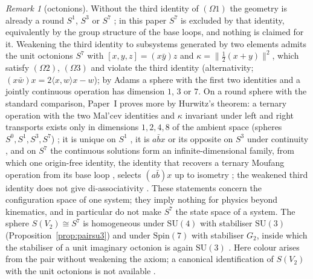 \documentclass[aps,pra,onecolumn,superscriptaddress,nofootinbib,10pt]{revtex4-2}
\theoremstyle{definition}
\theoremstyle{remark}
\newtheorem{remark}[theorem]{Remark}
\newcommand{\ip}[2]{\langle #1,#2\rangle}
\newcommand{\hp}[3]{[#1,#2,#3]}
\newcommand{\SU}{\mathrm{SU}}
\begin{document}
\begin{remark}[octonions]\label{rem:octonions}
Without the third identity of $(\Omega1)$ the geometry is already a round $S^1$, $S^3$ or $S^7$
\cite[Thm.~5.18, Cor.~5.19]{PaperI}; in this paper $S^7$ is excluded by that identity, equivalently by the group
structure of the base loops, and nothing is claimed for it.  Weakening the third identity to subsystems
generated by two elements admits the unit octonions $S^7$ with $\hp{x}{y}{z}=(x\bar y)z$ and $\kappa=\lVert\tfrac12(x+y)\rVert^2$, which satisfy
$(\Omega2)$, $(\Omega3)$ and violate the third identity (alternativity; $(x\bar w)x=2\ip{x}{w}x-w$); by
Adams \cite{Adams} a sphere with the first two identities and a jointly continuous operation has dimension $1$, $3$ or $7$.  On a round sphere
with the standard comparison, Paper~I proves more by Hurwitz's theorem: a ternary operation with the two
Mal'cev identities and $\kappa$ invariant under left and right transports exists only in dimensions $1,2,4,8$
of the ambient space (spheres $S^0,S^1,S^3,S^7$) \cite[Prop.~5.13]{PaperI}; it is unique on $S^1$ \cite[Rem.~5.14]{PaperI}, it is $a\bar bx$ or its
opposite on $S^3$ under continuity \cite[Thm.~5.15]{PaperI}, and on $S^7$ the continuous solutions form an
infinite-dimensional family, from which one origin-free identity, the identity that recovers a ternary
Moufang operation from its base loop \cite{BK12}, selects $(a\bar b)x$ up to isometry
\cite[Props.~5.16, 5.17]{PaperI}; the weakened third identity does not give di-associativity
\cite[Prop.~5.10]{PaperI}.  These statements concern the configuration space of one system; they imply
nothing for physics beyond kinematics, and in particular do not make $S^7$ the state space of a system.  The sphere
$S(V_2)\cong S^7$ is homogeneous under $\SU(4)$ with stabiliser $\SU(3)$
(Proposition~\ref{prop:pairsu3}) and under $\mathrm{Spin}(7)$ with stabiliser $G_2$, inside which the
stabiliser of a unit imaginary octonion is again $\SU(3)$ \cite{GG,Baez}.  Here colour arises from the
pair without weakening the axiom; a canonical identification of $S(V_2)$ with the unit octonions is
not available \cite{Dixon,Furey}.
\end{remark}
\end{document}
